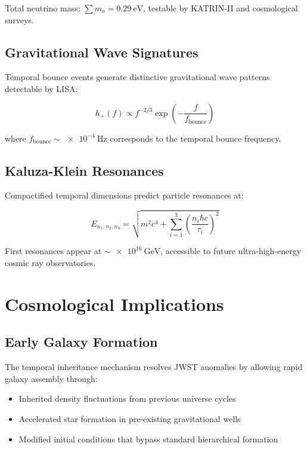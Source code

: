 \documentclass[reprint,amsmath,amssymb,aps,prd,nofootinbib]{revtex4-2}
\begin{document}
Total neutrino mass: $\sum m_\nu = \SI{0.29}{\electronvolt}$, testable by KATRIN-II and cosmological surveys.

\subsection{Gravitational Wave Signatures}

Temporal bounce events generate distinctive gravitational wave patterns detectable by LISA:

\begin{equation}
h_+(f) \propto f^{-2/3} \exp\left(-\frac{f}{f_{\text{bounce}}}\right)
\label{eq:gw_signature}
\end{equation}

where $f_{\text{bounce}} \sim \SI{e-4}{\hertz}$ corresponds to the temporal bounce frequency.

\subsection{Kaluza-Klein Resonances}

Compactified temporal dimensions predict particle resonances at:

\begin{equation}
E_{n_1,n_2,n_3} = \sqrt{m^2c^4 + \sum_{i=1}^{3}\left(\frac{n_i\hbar c}{\tau_i}\right)^2}
\label{eq:kk_resonances}
\end{equation}

First resonances appear at $\sim\SI{e16}{\giga\electronvolt}$, accessible to future ultra-high-energy cosmic ray observatories.

\section{Cosmological Implications}\label{sec:cosmology}

\subsection{Early Galaxy Formation}

The temporal inheritance mechanism resolves JWST anomalies by allowing rapid galaxy assembly through:

\begin{itemize}
\item Inherited density fluctuations from previous universe cycles
\item Accelerated star formation in pre-existing gravitational wells
\item Modified initial conditions that bypass standard hierarchical formation
\end{itemize}
\end{document}
